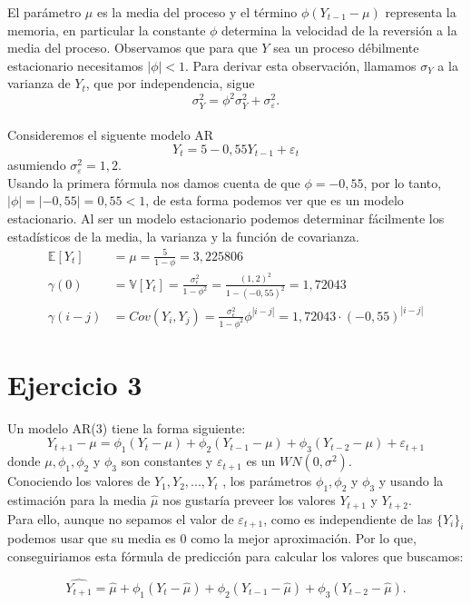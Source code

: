 \documentclass[a4paper,]{article}
\begin{document}
El parámetro $\mu$ es la media del proceso y el término $\phi(Y_{t-1}-\mu)$ representa la memoria, en particular la constante $\phi$ determina la velocidad de la reversión a la media del proceso. Observamos que para que $Y$ sea un proceso débilmente estacionario necesitamos $|\phi|<1$. Para derivar esta observación, llamamos $\sigma_Y$ a la varianza de $Y_t$, que por independencia, sigue $$\sigma_Y^2=\phi^2\sigma_Y^2+\sigma_\varepsilon^2.$$
\\
Consideremos el siguente modelo AR $$Y_t=5-0,55Y_{t-1}+\varepsilon_t$$ asumiendo $\sigma_\varepsilon^2=1,2.$ \\

Usando la primera fórmula nos damos cuenta de que $\phi=-0,55$, por lo tanto, $|\phi|=|-0,55|=0,55<1$, de esta forma podemos ver que es un modelo estacionario. Al ser un modelo estacionario podemos determinar fácilmente los estadísticos de la media, la varianza y la función de covarianza.
\begin{align*}
    \mathbb{E}[Y_t]&=\mu=\frac{5}{1-\phi}=3,225806 \\
    \gamma(0)&=\mathbb{V}[Y_t]=\frac{\sigma_\epsilon^2}{1-\phi^2}=\frac{(1,2)^2}{1-(-0,55)^2}=1,72043 \\
    \gamma(i-j)&=Cov(Y_i,Y_j)=\frac{\sigma_\epsilon^2}{1-\phi^2} \phi^{|i-j|}=1,72043 \cdot (-0,55)^{|i-j|}
\end{align*}

\section*{Ejercicio 3}
Un modelo AR(3) tiene la forma siguiente:
 $$Y_{t+1} - \mu = \phi_{1}(Y_t - \mu) + \phi_{2}(Y_{t-1} -\mu) + \phi_{3}(Y_{t-2} -\mu) + \varepsilon_{t+1}$$ donde $\mu, \phi_{1},\phi_{2} $ y $ \phi_{3} $ son constantes y $\varepsilon_{t+1}$ es un $WN(0, \sigma^2)$.\\

Conociendo los valores de $Y_{1},Y_{2},...,Y_{t}$ , los parámetros $\phi_{1},\phi_{2} $ y $ \phi_{3} $ y usando la estimación para la media $\hat{\mu}$ nos gustaría preveer los valores $Y_{t+1}$ y $Y_{t+2}$.\\

Para ello, aunque no sepamos el valor de $\varepsilon_{t+1}$, como es independiente de las $\{Y_{i}\}_i$  podemos usar que su media es 0 como la mejor aproximación. Por lo que, conseguiriamos esta fórmula de predicción para calcular los valores que buscamos: 

 $$\hat{Y_{t+1}} = \hat{\mu}  + \phi_{1}(Y_t - \hat{\mu}) + \phi_{2}(Y_{t-1} -\hat{\mu}) + \phi_{3}(Y_{t-2} -\hat{\mu}).$$
\end{document}
